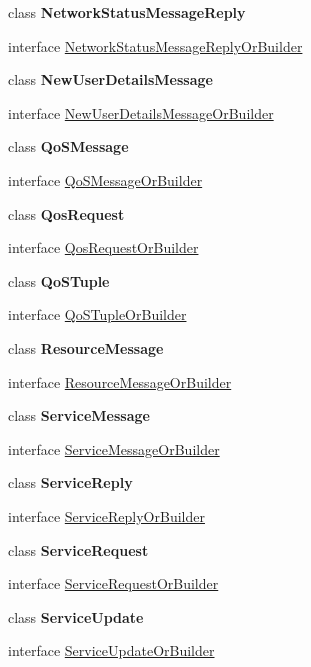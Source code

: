 \begin{DoxyCompactItemize}
class {\bfseries Network\+Status\+Message\+Reply}
\item 
interface \hyperlink{interfaceeu_1_1uloop_1_1messages_1_1UloopMessages_1_1NetworkStatusMessageReplyOrBuilder}{Network\+Status\+Message\+Reply\+Or\+Builder}
\item 
class {\bfseries New\+User\+Details\+Message}
\item 
interface \hyperlink{interfaceeu_1_1uloop_1_1messages_1_1UloopMessages_1_1NewUserDetailsMessageOrBuilder}{New\+User\+Details\+Message\+Or\+Builder}
\item 
class {\bfseries Qo\+S\+Message}
\item 
interface \hyperlink{interfaceeu_1_1uloop_1_1messages_1_1UloopMessages_1_1QoSMessageOrBuilder}{Qo\+S\+Message\+Or\+Builder}
\item 
class {\bfseries Qos\+Request}
\item 
interface \hyperlink{interfaceeu_1_1uloop_1_1messages_1_1UloopMessages_1_1QosRequestOrBuilder}{Qos\+Request\+Or\+Builder}
\item 
class {\bfseries Qo\+S\+Tuple}
\item 
interface \hyperlink{interfaceeu_1_1uloop_1_1messages_1_1UloopMessages_1_1QoSTupleOrBuilder}{Qo\+S\+Tuple\+Or\+Builder}
\item 
class {\bfseries Resource\+Message}
\item 
interface \hyperlink{interfaceeu_1_1uloop_1_1messages_1_1UloopMessages_1_1ResourceMessageOrBuilder}{Resource\+Message\+Or\+Builder}
\item 
class {\bfseries Service\+Message}
\item 
interface \hyperlink{interfaceeu_1_1uloop_1_1messages_1_1UloopMessages_1_1ServiceMessageOrBuilder}{Service\+Message\+Or\+Builder}
\item 
class {\bfseries Service\+Reply}
\item 
interface \hyperlink{interfaceeu_1_1uloop_1_1messages_1_1UloopMessages_1_1ServiceReplyOrBuilder}{Service\+Reply\+Or\+Builder}
\item 
class {\bfseries Service\+Request}
\item 
interface \hyperlink{interfaceeu_1_1uloop_1_1messages_1_1UloopMessages_1_1ServiceRequestOrBuilder}{Service\+Request\+Or\+Builder}
\item 
class {\bfseries Service\+Update}
\item 
interface \hyperlink{interfaceeu_1_1uloop_1_1messages_1_1UloopMessages_1_1ServiceUpdateOrBuilder}{Service\+Update\+Or\+Builder}
\item 

\end{DoxyCompactItemize}
